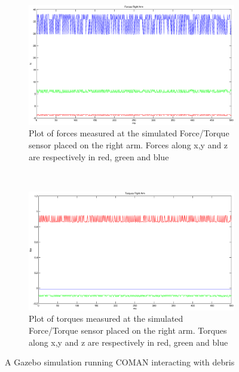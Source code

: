 \begin{figure}
\begin{subfigure}[b]{0.475\textwidth}
                \includegraphics[width=\textwidth]{images/coman_ft_c.eps}
                \caption{Plot of forces measured at the simulated Force/Torque sensor placed on the right arm. Forces along x,y and z are respectively in red, green and blue}
                \label{yarp_simulation_coman_c}
        \end{subfigure}
        \\
        \begin{subfigure}[b]{0.475\textwidth}
                \includegraphics[width=\textwidth]{images/coman_ft_d.eps}
                \caption{Plot of torques measured at the simulated Force/Torque sensor placed on the right arm. Torques along x,y and z are respectively in red, green and blue}
                \label{yarp_simulation_coman_d}
        \end{subfigure}
        \caption{A Gazebo simulation running COMAN interacting with debris}\label{force_torque}
\end{figure}

